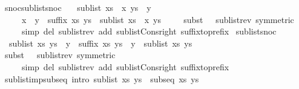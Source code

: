 \begin{isabellebody}
\endisatagproof
{\isafoldproof}%
%
\isadelimproof
\isanewline
%
\endisadelimproof
\isanewline
{}\isamarkupfalse%
\ snoc{\isacharunderscore}sublist{\isacharunderscore}snoc{\isacharcolon}\ \isanewline
\ \ {\isachardoublequoteopen}sublist\ {\isacharparenleft}xs\ {\isacharat}\ {\isacharbrackleft}x{\isacharbrackright}{\isacharparenright}\ {\isacharparenleft}ys\ {\isacharat}\ {\isacharbrackleft}y{\isacharbrackright}{\isacharparenright}\ {\isasymlongleftrightarrow}\ \isanewline
\ \ \ \ \ {\isacharparenleft}x\ {\isacharequal}\ y\ {\isasymand}\ suffix\ xs\ ys\ {\isasymor}\ sublist\ {\isacharparenleft}xs\ {\isacharat}\ {\isacharbrackleft}x{\isacharbrackright}{\isacharparenright}\ ys{\isacharparenright}\ {\isachardoublequoteclose}\isanewline
%
\isadelimproof
\ \ %
\endisadelimproof
%
\isatagproof
{}\isamarkupfalse%
\ {\isacharparenleft}subst\ {\isacharparenleft}{}\ {}{\isacharparenright}\ sublist{\isacharunderscore}rev\ {\isacharbrackleft}symmetric{\isacharbrackright}{\isacharparenright}\isanewline
\ \ \ \ \ {\isacharparenleft}simp\ del{\isacharcolon}\ sublist{\isacharunderscore}rev\ add{\isacharcolon}\ sublist{\isacharunderscore}Cons{\isacharunderscore}right\ suffix{\isacharunderscore}to{\isacharunderscore}prefix{\isacharparenright}%
\endisatagproof
{\isafoldproof}%
%
\isadelimproof
\isanewline
%
\endisadelimproof
\isanewline
{}\isamarkupfalse%
\ sublist{\isacharunderscore}snoc{\isacharcolon}\isanewline
\ \ {\isachardoublequoteopen}sublist\ xs\ {\isacharparenleft}ys\ {\isacharat}\ {\isacharbrackleft}y{\isacharbrackright}{\isacharparenright}\ {\isasymlongleftrightarrow}\ suffix\ xs\ {\isacharparenleft}ys\ {\isacharat}\ {\isacharbrackleft}y{\isacharbrackright}{\isacharparenright}\ {\isasymor}\ sublist\ xs\ ys{\isachardoublequoteclose}\isanewline
%
\isadelimproof
\ \ %
\endisadelimproof
%
\isatagproof
{}\isamarkupfalse%
\ {\isacharparenleft}subst\ {\isacharparenleft}{}\ {}{\isacharparenright}\ sublist{\isacharunderscore}rev\ {\isacharbrackleft}symmetric{\isacharbrackright}{\isacharparenright}\isanewline
\ \ \ \ \ {\isacharparenleft}simp\ del{\isacharcolon}\ sublist{\isacharunderscore}rev\ add{\isacharcolon}\ sublist{\isacharunderscore}Cons{\isacharunderscore}right\ suffix{\isacharunderscore}to{\isacharunderscore}prefix{\isacharparenright}%
\endisatagproof
{\isafoldproof}%
%
\isadelimproof
\ \ \ \ \ \isanewline
%
\endisadelimproof
\ \ \ \ \ \isanewline
{}\isamarkupfalse%
\ sublist{\isacharunderscore}imp{\isacharunderscore}subseq\ {\isacharbrackleft}intro{\isacharbrackright}{\isacharcolon}\ {\isachardoublequoteopen}sublist\ xs\ ys\ {\isasymLongrightarrow}\ subseq\ xs\ ys{\isachardoublequoteclose}\isanewline

\end{isabellebody}
